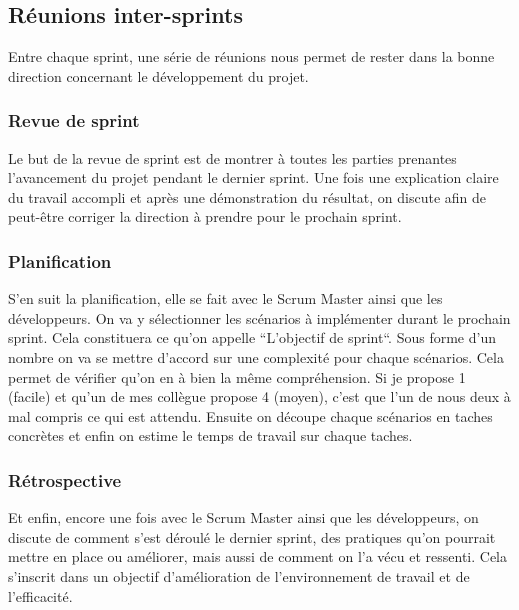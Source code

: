 \documentclass[12pt, a4paper]{report}
\begin{document}
            \subsection{Réunions inter-sprints}
                Entre chaque sprint, une série de réunions nous permet de rester dans la bonne direction concernant le développement du projet.
                \subsubsection{Revue de sprint}
                    Le but de la revue de sprint est de montrer à toutes les parties prenantes l'avancement du projet pendant le dernier sprint.\newline
                    Une fois une explication claire du travail accompli et après une démonstration du résultat, on discute afin de peut-être corriger la direction à prendre pour le prochain sprint.
                \subsubsection{Planification}
                    S'en suit la planification, elle se fait avec le Scrum Master ainsi que les développeurs.\newline
                    On va y sélectionner les scénarios à implémenter durant le prochain sprint. Cela constituera ce qu'on appelle ``L'objectif de sprint``.\newline
                    Sous forme d'un nombre on va se mettre d'accord sur une complexité pour chaque scénarios. Cela permet de vérifier qu'on en à bien la même compréhension. Si je propose 1 (facile) et qu'un de mes collègue propose 4 (moyen), c'est que l'un de nous deux à mal compris ce qui est attendu.\newline
                    Ensuite on découpe chaque scénarios en taches concrètes et enfin on estime le temps de travail sur chaque taches.
                \subsubsection{Rétrospective}
                    Et enfin, encore une fois avec le Scrum Master ainsi que les développeurs, on discute de comment s'est déroulé le dernier sprint, des pratiques qu'on pourrait mettre en place ou améliorer, mais aussi de comment on l'a vécu et ressenti.\newline
                    Cela s'inscrit dans un objectif d'amélioration de l'environnement de travail et de l'efficacité.
\end{document}

